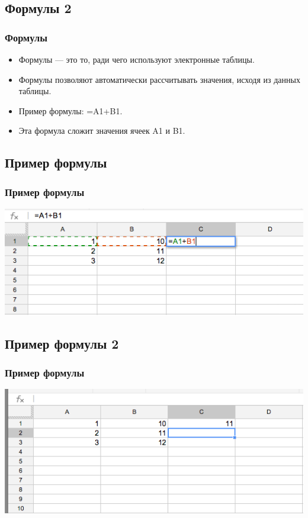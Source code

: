\documentclass[compress,red]{beamer}
\begin{document}
\subsection{Формулы 2}
\begin{frame}[fragile]
  \frametitle{Формулы}
  \begin{itemize}
    \item Формулы --- это то, ради чего используют электронные таблицы.
    \item Формулы позволяют автоматически рассчитывать значения, исходя из данных таблицы.
    \item Пример формулы: =A1+B1.  
    \item Эта формула сложит значения ячеек A1 и B1.
  \end{itemize}
\end{frame}

\subsection{Пример формулы}
\begin{frame}[fragile]
  \frametitle{Пример формулы}
  \centerline{\includegraphics[width=1.0\textwidth]{images/06.png}}
\end{frame}

\subsection{Пример формулы 2}
\begin{frame}[fragile]
  \frametitle{Пример формулы}
  \centerline{\includegraphics[width=1.0\textwidth]{images/07.png}}
\end{frame}
\end{document}
